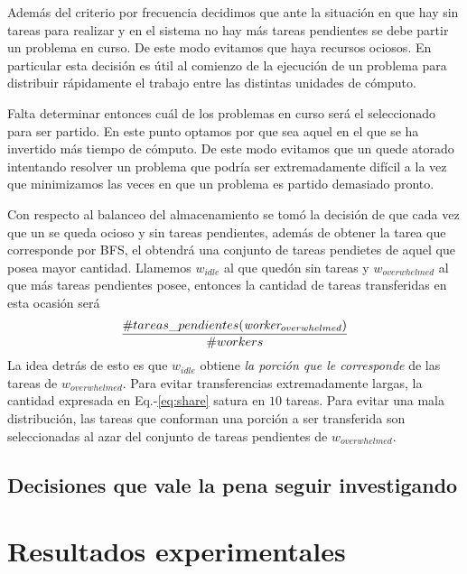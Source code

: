 Además del criterio por frecuencia decidimos que ante la situación en que hay
\ws sin tareas para realizar y en el sistema no hay más tareas pendientes se
debe partir un problema en curso. De este modo evitamos que haya recursos
ociosos. En particular esta decisión es útil al comienzo de la ejecución de un
problema para distribuir rápidamente el trabajo entre las distintas unidades
de cómputo.

Falta determinar entonces cuál de los problemas en curso será el seleccionado
para ser partido. En este punto optamos por que sea aquel en el que se ha
invertido más tiempo de cómputo. De este modo evitamos que un \w quede atorado
intentando resolver un problema que podría ser extremadamente difícil a la vez
que minimizamos las veces en que un problema es partido demasiado pronto.

Con respecto al balanceo del almacenamiento se tomó la decisión de que cada
vez que un \w se queda ocioso y sin tareas pendientes, además de obtener la
tarea que corresponde por BFS, el \w obtendrá una conjunto de tareas pendietes
de aquel \w que posea mayor cantidad. Llamemos $w_{idle}$ al \w que quedón sin
tareas y $w_{overwhelmed}$ al que más tareas pendientes posee, entonces la
cantidad de tareas transferidas en esta ocasión será \begin{equation}
\frac{\#tareas\_pendientes(\emph{worker}_{overwhelmed})}{\# workers}
\label{eq:share}\end{equation} La idea detrás de esto es que $w_{idle}$
obtiene \emph{la porción que le corresponde} de las tareas de
$w_{overwhelmed}$. Para evitar transferencias extremadamente largas, la
cantidad expresada en Eq.-\ref{eq:share} satura en $10$ tareas. Para evitar
una mala distribución, las tareas que conforman una porción a ser transferida
son seleccionadas al azar del conjunto de tareas pendientes de
$w_{overwhelmed}$.

\subsection{Decisiones que vale la pena seguir investigando}

\section{Resultados experimentales}

